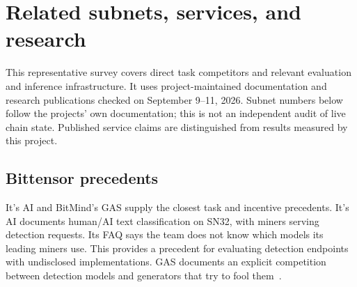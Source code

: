 \section{Related subnets, services, and research}\label{related-work}

This representative survey covers direct task competitors and relevant
evaluation and inference infrastructure. It uses project-maintained
documentation and research publications checked on September 9--11, 2026.
Subnet numbers below follow the projects' own documentation; this is
not an independent audit of live chain state. Published service claims
are distinguished from results measured by this project.

\subsection{Bittensor precedents}\label{related-subnets}

It's AI and BitMind's GAS supply the closest task and incentive
precedents. It's AI documents human/AI text classification on SN32,
with miners serving detection requests. Its FAQ says the team does not
know which models its leading miners use. This provides a precedent for
evaluating detection endpoints with undisclosed implementations. GAS
documents an explicit competition between detection models and
generators that try to fool them~\cite{itsai,itsaifaq,bitmindgas}.

